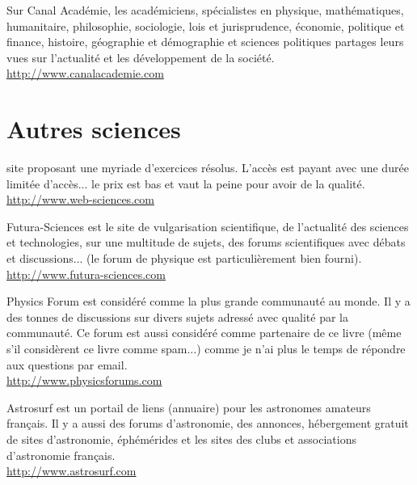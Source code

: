 	\bcdfrance{} Sur Canal Académie, les académiciens, spécialistes en physique, mathématiques, humanitaire, philosophie, sociologie, lois et jurisprudence, économie, politique et finance, histoire, géographie et démographie et sciences politiques partages leurs vues sur l'actualité et les développement de la société.\\
	\href{http://www.canalacademie.com}{\color{blue}http://www.canalacademie.com}

	\pagebreak
	\section{Autres sciences}

	{\Large {}}{\Large {}}{\Large {}}{\Large {}}\bcdfrance{} site proposant une myriade d'exercices résolus. L'accès est payant avec une durée limitée d'accès... le prix est bas et vaut la peine pour avoir de la qualité.\\
	\href{http://www.web-sciences.com}{\color{blue}http://www.web-sciences.com}
	
	{\Large {}}{\Large {}}{\Large {}}{\Large {}}{\Large {}}\bcdfrance{} Futura-Sciences est le site de vulgarisation scientifique, de l'actualité des sciences et technologies, sur une multitude de sujets, des forums scientifiques avec débats et discussions... (le forum de physique est particulièrement bien fourni).\\
	\href{http://www.futura-sciences.com}{\color{blue}http://www.futura-sciences.com}
	
	{\Large {}}{\Large {}}{\Large {}}{\Large {}}{\Large {}}\bcdfrance{} Physics Forum est considéré comme la plus grande communauté au monde. Il y a des tonnes de discussions sur divers sujets adressé avec qualité par la communauté. Ce forum est aussi considéré comme partenaire de ce livre (même s'il considèrent ce livre comme spam...) comme je n'ai plus le temps de répondre aux questions par email. \\
	\href{http://www.physicsforums.com}{\color{blue}http://www.physicsforums.com}
	
	{\Large {}}{\Large {}}{\Large {}}{\Large {}}{\Large {}}{\Large {}}{\Large {}}{\Large {}}\bcdfrance{} Astrosurf est un portail de liens (annuaire) pour les astronomes amateurs français. Il y a aussi des forums d'astronomie, des annonces, hébergement gratuit de sites d'astronomie, éphémérides et les sites des clubs et associations d'astronomie français.\\
	\href{http://www.astrosurf.com}{\color{blue}http://www.astrosurf.com}
	
